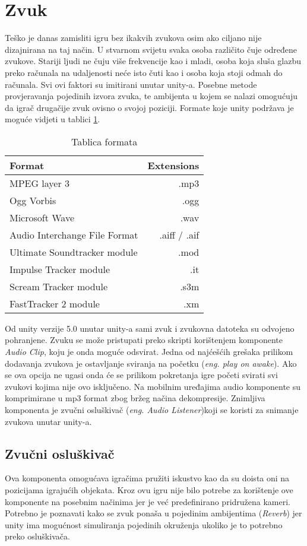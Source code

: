 \section{Zvuk}
Teško je danas zamisliti igru bez ikakvih zvukova osim ako ciljano nije dizajnirana na taj način. U stvarnom svijetu svaka osoba različito čuje određene zvukove. Stariji ljudi ne čuju više frekvencije kao i mladi, osoba koja sluša glazbu preko računala na udaljenosti neće isto čuti kao i osoba koja stoji odmah do računala. Svi ovi faktori su imitirani unutar unity-a. Posebne metode provjeravanja pojedinih izvora zvuka, te ambijenta u kojem se nalazi omogućuju da igrač drugačije zvuk ovisno o svojoj poziciji. Formate koje unity podržava je moguće vidjeti u tablici \ref{table:tablicaFormata}.

\begin{table}[h]
\large
\begin{tabular}{ l | r } \hline	
	Format & Extensions \\
	\hline MPEG layer 3 & .mp3 \\
	\hline Ogg Vorbis  & .ogg \\
	\hline Microsoft Wave  & .wav \\
	\hline Audio Interchange File Format & .aiff / .aif \\
	\hline Ultimate Soundtracker module  & .mod \\
	\hline Impulse Tracker module  & .it \\
	\hline Scream Tracker module & .s3m \\
	\hline FastTracker 2 module  & .xm \\
\end{tabular}
	\label{table:tablicaFormata}
	\caption{Tablica formata}
\end{table}

Od unity verzije 5.0 unutar unity-a sami zvuk i zvukovna datoteka su odvojeno pohranjene. Zvuku se može pristupati preko skripti korištenjem komponente \emph{Audio Clip}, koju je onda moguće odsvirat. Jedna od najćešćih grešaka prilikom dodavanja zvukova je ostavljanje sviranja na početku (\emph{eng. play on awake}). Ako se ova opcija ne ugasi onda će se prilikom pokretanja igre početi svirati svi zvukovi kojima nije ovo isključeno. Na mobilnim uređajima audio komponente su komprimirane u mp3 format zbog bržeg načina dekompresije. Znimljiva komponenta je zvučni osluškivač (\emph{eng. Audio Listener})koji se koristi za snimanje zvukova unutar unity-a.
\newpage
\subsection{Zvučni osluškivač}
Ova komponenta omogućava igračima pružiti iskustvo kao da su doista oni na pozicijama igrajućih objekata. Kroz ovu igru nije bilo potrebe za korištenje ove komponente na posebnim načinima jer je već predefinirano pridružena kameri. Potrebno je poznavati kako se zvuk ponaša u pojedinim ambijentima (\emph{Reverb}) jer unity ima mogućnost simuliranja pojedinih okruženja ukoliko je to potrebno preko osluškivača. \par

